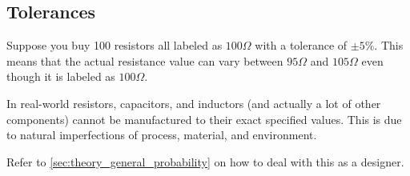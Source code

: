 \subsection{Tolerances}
\label{sec:theory_general_tolerances}

Suppose you buy 100 resistors all labeled as \(100 \Omega\)
with a tolerance of \(\pm 5\%\). This means that the actual
resistance value can vary between \(95 \Omega\) and \(105 \Omega\)
even though it is labeled as \(100 \Omega\).

In real-world resistors, capacitors, and inductors (and
actually a lot of other components) cannot be manufactured to
their exact specified values. This is due to natural
imperfections of process, material, and environment.

Refer to \ref{sec:theory_general_probability} on how to deal
with this as a designer.


